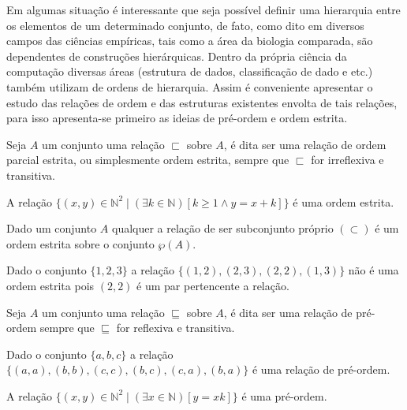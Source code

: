 Em algumas situação é interessante que seja possível definir uma hierarquia entre os elementos de um determinado conjunto, de fato, como dito em \cite{abe1991-TC} diversos campos das ciências empíricas, tais como a área da biologia comparada, são dependentes de construções hierárquicas. Dentro da própria ciência da computação diversas áreas (estrutura de dados, classificação de dado e etc.) também utilizam de ordens de hierarquia. Assim é conveniente apresentar o estudo das relações de ordem e das estruturas existentes envolta de tais relações, para isso apresenta-se primeiro as ideias de pré-ordem e ordem estrita.

\begin{definition}\label{def:OrdemParcialEstrita}
	Seja $A$ um conjunto uma relação $\sqsubset$ sobre $A$, é dita ser uma relação de ordem parcial estrita, ou simplesmente ordem estrita, sempre que $\sqsubset$ for irreflexiva e transitiva.
\end{definition}

\begin{example}
	A relação $\{(x, y) \in \mathbb{N}^2 \mid (\exists k \in \mathbb{N})[k \geq 1 \land y = x + k	]\}$ é uma ordem estrita.
\end{example}

\begin{example}
	Dado um conjunto $A$ qualquer a relação de ser subconjunto próprio $(\subset)$ é um ordem estrita sobre o conjunto $\wp(A)$.
\end{example}

\begin{example}
	Dado o conjunto $\{1, 2, 3\}$ a relação $\{(1, 2), (2, 3), (2, 2), (1, 3)\}$ não é uma ordem estrita pois $(2, 2)$ é um par pertencente a relação.
\end{example}

\begin{definition}
	Seja $A$ um conjunto uma relação $\sqsubseteq$ sobre $A$, é dita ser uma relação de pré-ordem sempre que $\sqsubseteq$ for reflexiva e transitiva.
\end{definition}

\begin{example}
	Dado o conjunto $\{a, b, c\}$ a relação $\{(a, a), (b, b), (c, c), (b, c), (c, a), (b, a)\}$ é uma relação de pré-ordem.
\end{example}

\begin{example}
	A relação $\{(x, y) \in \mathbb{N}^2 \mid (\exists x \in \mathbb{N})[y = xk]\}$ é uma pré-ordem.
\end{example}

